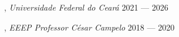 , \textit{Universidade Federal do Ceará}	\hfill 2021 --- 2026

, \textit{EEEP Professor César Campelo} \hfill	2018 --- 2020
